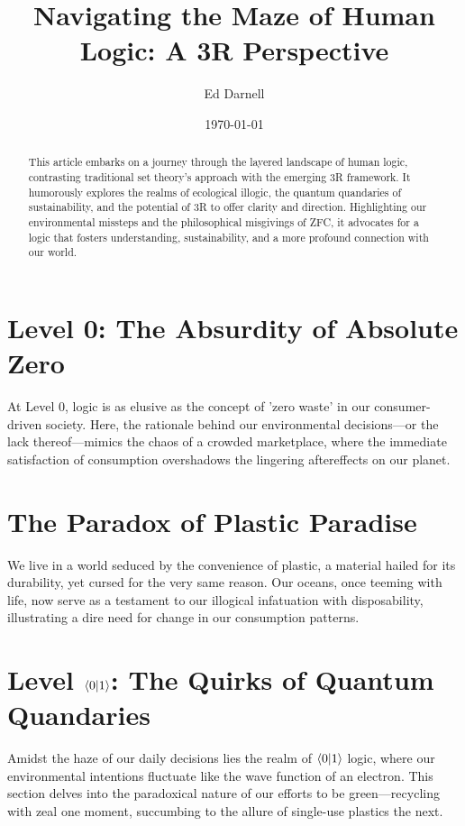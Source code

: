 \documentclass[12pt]{article}
\title{Navigating the Maze of Human Logic: A 3R Perspective}
\author{Ed Darnell}
\date{\today}
\begin{document}
\maketitle

\begin{abstract}
    This article embarks on a journey through the layered landscape of human logic, contrasting traditional set theory's approach with the emerging 3R framework. It humorously explores the realms of ecological illogic, the quantum quandaries of sustainability, and the potential of 3R to offer clarity and direction. Highlighting our environmental missteps and the philosophical misgivings of ZFC, it advocates for a logic that fosters understanding, sustainability, and a more profound connection with our world.
\end{abstract}

\section*{Level 0: The Absurdity of Absolute Zero}

At Level 0, logic is as elusive as the concept of 'zero waste' in our consumer-driven society. Here, the rationale behind our environmental decisions—or the lack thereof—mimics the chaos of a crowded marketplace, where the immediate satisfaction of consumption overshadows the lingering aftereffects on our planet.

\section*{The Paradox of Plastic Paradise}

We live in a world seduced by the convenience of plastic, a material hailed for its durability, yet cursed for the very same reason. Our oceans, once teeming with life, now serve as a testament to our illogical infatuation with disposability, illustrating a dire need for change in our consumption patterns.

\section*{Level \(\langle 0 | 1 \rangle\): The Quirks of Quantum Quandaries}

Amidst the haze of our daily decisions lies the realm of \(\langle 0 | 1 \rangle\) logic, where our environmental intentions fluctuate like the wave function of an electron. This section delves into the paradoxical nature of our efforts to be green—recycling with zeal one moment, succumbing to the allure of single-use plastics the next.
\end{document}
